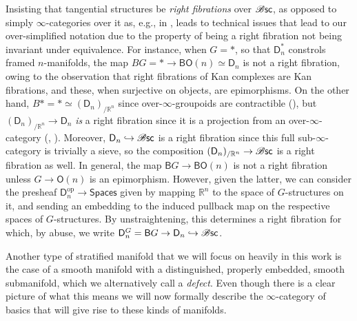\documentclass[../text]{subfiles}
\begin{document}
\begin{remark}
    Insisting that tangential structures be \emph{right fibrations} over $\mathscr{B} \mathsf{sc}$, as opposed to simply $\infty$-categories over it as, e.g., in \cite{ayala2020factorization}, leads to technical issues that lead to our over-simplified notation due to the property of being a right fibration not being invariant under equivalence. For instance, when $G=\ast$, so that $\mathsf{D}^\ast_n$ constrols framed $n$-manifolds, the map $BG=\ast\to \mathsf{BO}(n)\simeq\mathsf{D}_n$ is not a right fibration, owing to the observation that right fibrations of Kan complexes are Kan fibrations, and these, when surjective on objects, are epimorphisms. On the other hand, $B\ast=\ast\simeq (\mathsf{D}_n)_{/\mathbb{R}^n}$ since over-$\infty$-groupoids are contractible (\cite[Corollary 018Y]{lurie_kerodon}), but $(\mathsf{D}_n)_{/\mathbb{R}^n}\to \mathsf{D}_n$ \emph{is} a right fibration since it is a projection from an over-$\infty$-category (\cite[Proposition 018F]{lurie_kerodon}, \cite{joyal}). Moreover, $\mathsf{D}_n\hookrightarrow \mathscr{B} \mathsf{sc}$ is a right fibration since this full sub-$\infty$-category is trivially a sieve, so the composition $(\mathsf{D}_n)_{/\mathbb{R}^n}\to \mathscr{B} \mathsf{sc}$ is a right fibration as well. In general, the map $\mathsf{B}G\to \mathsf{BO}(n)$ is not a right fibration unless $G\to\mathsf{O}(n)$ is an epimorphism. However, given the latter, we can consider the presheaf $\mathsf{D}_n^{\text{op}}\to\mathsf{Spaces}$ given by mapping $\mathbb{R}^n$ to the space of $G$-structures on it, and sending an embedding to the induced pullback map on the respective spaces of $G$-structures. By unstraightening, this determines a right fibration for which, by abuse, we write $\mathsf{D}^G_n=\mathsf{B}G\to \mathsf{D}_n\hookrightarrow\mathscr{B} \mathsf{sc}$.
\end{remark}

Another type of stratified manifold that we will focus on heavily in this work is the case of a smooth manifold with a distinguished, properly embedded, smooth submanifold, which we alternatively call a \emph{defect}. Even though there is a clear picture of what this means we will now formally describe the $\infty$-category of basics that will give rise to these kinds of manifolds.
\end{document}
